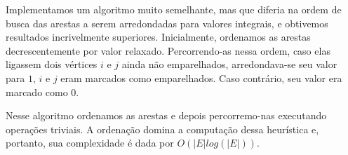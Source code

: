 \documentclass[11pt]{article}
\begin{document}
Implementamos um algoritmo muito semelhante, mas que diferia na ordem de
busca das arestas a serem arredondadas para valores integrais, e
obtivemos resultados incrivelmente superiores. Inicialmente, ordenamos
as arestas decrescentemente por valor relaxado. Percorrendo-as nessa
ordem, caso elas ligassem dois vértices $i$ e $j$ ainda não emparelhados,
arredondava-se seu valor para $1$, $i$ e $j$ eram marcados como
emparelhados. Caso contrário, seu valor era marcado como $0$. 

Nesse algoritmo ordenamos as arestas e depois percorremo-nas executando
operações triviais. A ordenação domina a computação dessa heurística e,
portanto, sua complexidade é dada por $O(|E| log (|E|))$.



\end{document}
